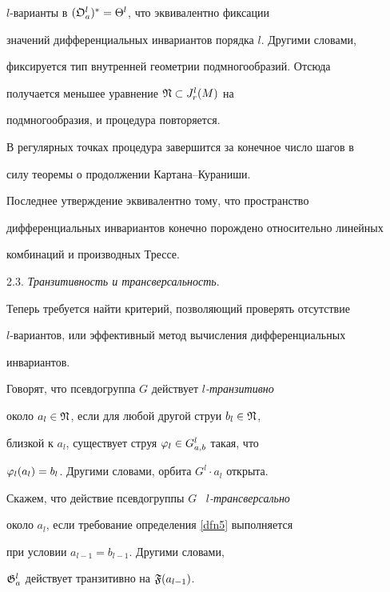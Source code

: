 $l$-варианты в $(\frak{O}^l_a)^*=\Theta^l$, что эквивалентно фиксации


значений дифференциальных инвариантов порядка $l$. Другими словами,


фиксируется тип внутренней геометрии подмногообразий. Отсюда


получается меньшее уравнение ${\frak N}\subset J^l_r(M)$ на


подмногообразия, и процедура повторяется.


В регулярных точках процедура завершится за конечное число шагов в


силу теоремы о продолжении Картана--Кураниши.





\begin{note}


Последнее утверждение эквивалентно тому, что пространство


дифференциальных инвариантов конечно порождено относительно линейных


комбинаций и производных Трессе.


\end{note}








2.3. {\it Транзитивность и трансверсальность}.


Теперь требуется найти критерий, позволяющий проверять отсутствие


$l$-вариантов, или эффективный метод вычисления дифференциальных


инвариантов.





\begin{defn}\label{dfn5}


Говорят, что псевдогруппа $G$ действует {\em $l$-транзитивно}


около $a_l\in\frak{N}$, если для любой другой струи $b_l\in\frak{N}$,


близкой к $a_l$, существует струя $\varphi_l\in G^l_{a,b}$ такая, что


$\varphi_l(a_l)=b_l$. Другими словами, орбита $G^l\cdot a_l$ открыта.


\end{defn}





\begin{defn}


Скажем, что действие псевдогруппы $G$ \ {\em $l$-трансверсально}


около $a_l$, если требование определения \ref{dfn5} выполняется


при условии $a_{l-1}=b_{l-1}$. Другими словами,


$\frak{G}^l_a$ действует транзитивно на $\frak{F}(a_{l-1})$.


\end{defn}






